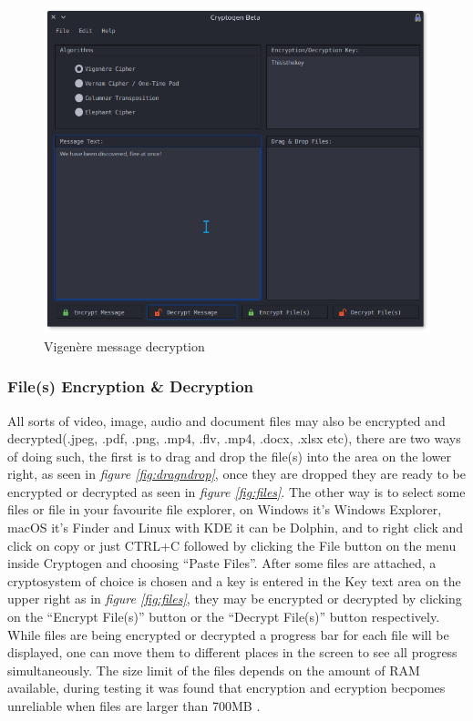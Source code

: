 \documentclass[11pt]{article}
\begin{document}
\begin{figure}[!htb]
\centering
\includegraphics[scale=0.55]{vigenere_message_plain}
\caption{Vigen\`ere message decryption} %
\label{fig:vigenere_message_plain} %
\end{figure}


\newpage
	\subsubsection{File(s) Encryption \& Decryption}
	All sorts of video, image, audio and document files may also be encrypted and decrypted(.jpeg, .pdf, .png, .mp4, .flv, .mp4, .docx, .xlsx  etc), there are two ways of doing such, the first is to drag and drop the file(s) into the area on the lower right, as seen in \textit{figure \ref{fig:dragndrop}}, once they are dropped they are ready to be encrypted or decrypted as seen in \textit{figure \ref{fig:files}}. The other way is to select some files or file in your favourite file explorer, on Windows it's Windows Explorer, macOS it's Finder and Linux with KDE it can be Dolphin, and to right click and click on copy or just CTRL+C followed by clicking the File button on the menu inside Cryptogen and choosing ``Paste Files''. After some files are attached, a cryptosystem of choice is chosen and a key is entered in the Key text area on the upper right as in \textit{figure \ref{fig:files}}, they may be encrypted or decrypted by clicking on the ``Encrypt File(s)'' button or the ``Decrypt File(s)'' button respectively. While files are being encrypted or decrypted a progress bar for each file will be displayed, one can move them to different places in the screen to see all progress simultaneously. The size limit of the files depends on the amount of RAM available, during testing it was found that encryption and ecryption becpomes unreliable when files are larger than 700MB .\\
\end{document}
